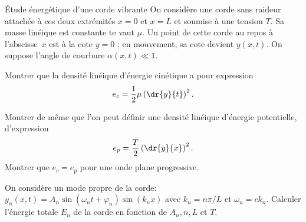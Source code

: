 \begin{exo}[PC][2][TD]{Étude énergétique d'une corde vibrante}
On considère une corde sans raideur attachée à ces deux extrémités $x=0$ et $x=L$ et soumise à une tension $T$. Sa masse linéique est constante te vaut $\mu$. Un point de cette corde au repos à l'abscisse~$x$ est à la cote $y=0$ ; en mouvement, sa cote devient $y(x, t)$. On suppose l'angle de courbure $\alpha(x,t) \ll 1$.
\begin{quest}
  \item Montrer que la densité linéique d'énergie cinétique a pour expression 
  \begin{equation}
    e_c = \frac{1}{2} \mu \left( \dr{y}{t} \right)^2.
  \end{equation}
  \item Montrer de même que l’on peut définir une densité linéique d'énergie potentielle, d'expression
  \begin{equation}
e_p=\frac{T}{2}\left( \dr{y}{x} \right)^2.
  \end{equation}
 Montrer que  $e_c=e_p$ pour une onde plane progressive.
  \item On considère un mode propre de la corde: $y_n(x, t)=A_n \sin \left(\omega_n t+\varphi_n\right) \sin \left(k_n x\right)$ avec $k_n=n \pi / L$ et $\omega_n = c k_n$. Calculer l'énergie totale $E_n$ de la corde en fonction de $A_n, n, L$ et $T$.
\end{quest}
\end{exo}

